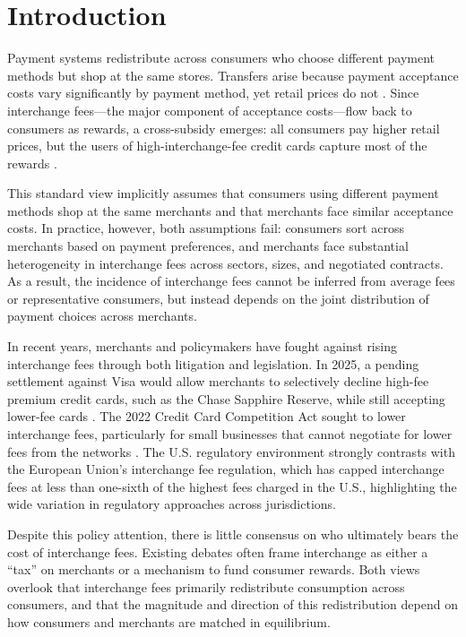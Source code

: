 \documentclass[11pt,english]{article}
\theoremstyle{remark}
\begin{document}
\section{Introduction}

Payment systems redistribute across consumers who choose different payment methods but shop at the same stores.
Transfers arise because payment acceptance costs vary significantly by payment method, yet retail prices do not \citep{Stavins2018}.
Since interchange fees---the major component of acceptance costs---flow back to consumers as rewards, a cross-subsidy emerges: all consumers pay higher retail prices, but the users of high-interchange-fee credit cards capture most of the rewards \citep{carlton1994antitrust}.

This standard view implicitly assumes that consumers using different payment methods shop at the same merchants and that merchants face similar acceptance costs. In practice, however, both assumptions fail: consumers sort across merchants based on payment preferences, and merchants face substantial heterogeneity in interchange fees across sectors, sizes, and negotiated contracts. As a result, the incidence of interchange fees cannot be inferred from average fees or representative consumers, but instead depends on the joint distribution of payment choices across merchants.

In recent years, merchants and policymakers have fought against rising interchange fees through both litigation and legislation.
In 2025, a pending settlement against Visa would allow merchants to selectively decline high-fee premium credit cards, such as the Chase Sapphire Reserve, while still accepting lower-fee cards \citep{Andriotis2025}.
The 2022 Credit Card Competition Act sought to lower interchange fees, particularly for small businesses that cannot negotiate for lower fees from the networks \citep{Andriotis2022}.
The U.S. regulatory environment strongly contrasts with the European Union's interchange fee regulation, which has capped interchange fees at less than one-sixth of the highest fees charged in the U.S., highlighting the wide variation in regulatory approaches across jurisdictions.

Despite this policy attention, there is little consensus on who ultimately bears the cost of interchange fees. Existing debates often frame interchange as either a ``tax'' on merchants or a mechanism to fund consumer rewards. Both views overlook that interchange fees primarily redistribute consumption across consumers, and that the magnitude and direction of this redistribution depend on how consumers and merchants are matched in equilibrium.
\end{document}
